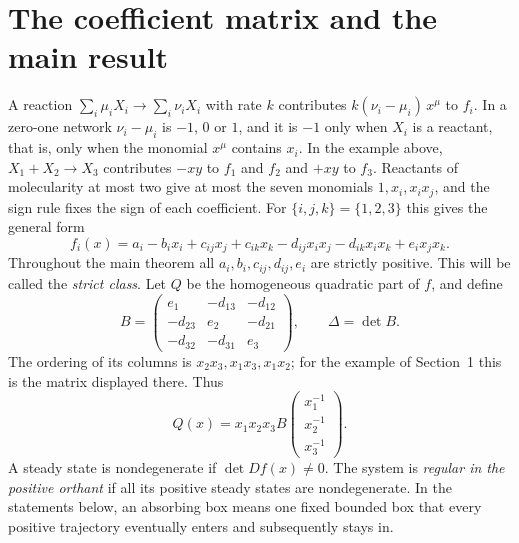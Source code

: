 \documentclass[11pt]{article}
\theoremstyle{remark}\newtheorem{remark}[theorem]{Remark}
\begin{document}
\section{The coefficient matrix and the main result}
A reaction $\sum_i\mu_iX_i\to\sum_i\nu_iX_i$ with rate $k$ contributes
$k(\nu_i-\mu_i)\,x^\mu$ to $f_i$. In a zero-one network $\nu_i-\mu_i$ is $-1$, $0$ or $1$,
and it is $-1$ only when $X_i$ is a reactant, that is, only when the monomial $x^\mu$
contains $x_i$. In the example above, $X_1+X_2\to X_3$ contributes $-xy$ to $f_1$ and
$f_2$ and $+xy$ to $f_3$. Reactants of molecularity at most two give at most the
seven monomials $1,x_i,x_ix_j$, and the sign rule fixes the sign of each
coefficient. For $\{i,j,k\}=\{1,2,3\}$ this gives the general form
\begin{equation}\label{eq:family}
 f_i(x)=a_i-b_i x_i+c_{ij}x_j+c_{ik}x_k
       -d_{ij}x_ix_j-d_{ik}x_ix_k+e_i x_jx_k.
\end{equation}
Throughout the main theorem all $a_i,b_i,c_{ij},d_{ij},e_i$ are strictly positive.
This will be called the \emph{strict class}. Let $Q$ be the homogeneous quadratic
part of $f$, and define
\begin{equation}\label{eq:B}
 B=\begin{pmatrix}
 e_1&-d_{13}&-d_{12}\\
 -d_{23}&e_2&-d_{21}\\
 -d_{32}&-d_{31}&e_3
 \end{pmatrix},\qquad \Delta=\det B.
\end{equation}
The ordering of its columns is $x_2x_3,x_1x_3,x_1x_2$; for the example of
Section~1 this is the matrix displayed there. Thus
\begin{equation}\label{eq:reciprocal}
 Q(x)=x_1x_2x_3 B\begin{pmatrix}x_1^{-1}\\x_2^{-1}\\x_3^{-1}\end{pmatrix}.
\end{equation}
A steady state is nondegenerate if $\det Df(x)\ne0$. The system is
\emph{regular in the positive orthant} if all its positive steady states are
nondegenerate. In the statements below, an absorbing box means one fixed bounded
box that every positive trajectory eventually enters and subsequently stays in.
\end{document}

